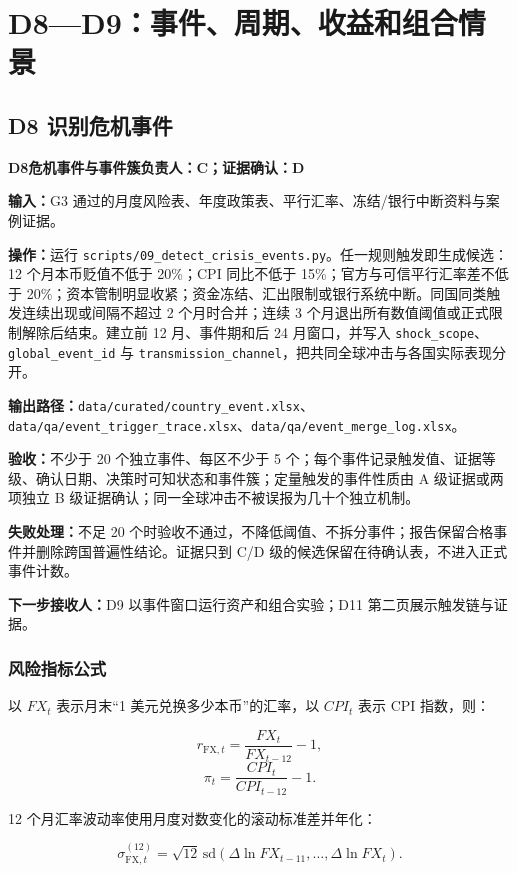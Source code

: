 \documentclass[UTF8,fontset=windows,12pt,openany]{ctexbook}
\newcommand{\Field}[1]{{\small\nolinkurl{#1}}}
\newcommand{\File}[1]{{\small\nolinkurl{#1}}}
\newcommand{\StepTitle}[3]{%
  \noindent\colorbox{DeepNavy}{\parbox{0.965\textwidth}{\color{white}\Large\bfseries #1\quad #2\hfill\normalsize #3}}\par\medskip
}
\newcommand{\CardRow}[2]{\noindent\textbf{#1：}#2\par}
\begin{document}
\chapter{D8—D9：事件、周期、收益和组合情景}

\section{D8 识别危机事件}
\StepTitle{D8}{危机事件与事件簇}{负责人：C；证据确认：D}
\CardRow{输入}{G3 通过的月度风险表、年度政策表、平行汇率、冻结/银行中断资料与案例证据。}
\CardRow{操作}{运行 \File{scripts/09_detect_crisis_events.py}。任一规则触发即生成候选：12 个月本币贬值不低于 20\%；CPI 同比不低于 15\%；官方与可信平行汇率差不低于 20\%；资本管制明显收紧；资金冻结、汇出限制或银行系统中断。同国同类触发连续出现或间隔不超过 2 个月时合并；连续 3 个月退出所有数值阈值或正式限制解除后结束。建立前 12 月、事件期和后 24 月窗口，并写入 \Field{shock_scope}、\Field{global_event_id} 与 \Field{transmission_channel}，把共同全球冲击与各国实际表现分开。}
\CardRow{输出路径}{\File{data/curated/country_event.xlsx}、\File{data/qa/event_trigger_trace.xlsx}、\File{data/qa/event_merge_log.xlsx}。}
\CardRow{验收}{不少于 20 个独立事件、每区不少于 5 个；每个事件记录触发值、证据等级、确认日期、决策时可知状态和事件簇；定量触发的事件性质由 A 级证据或两项独立 B 级证据确认；同一全球冲击不被误报为几十个独立机制。}
\CardRow{失败处理}{不足 20 个时验收不通过，不降低阈值、不拆分事件；报告保留合格事件并删除跨国普遍性结论。证据只到 C/D 级的候选保留在待确认表，不进入正式事件计数。}
\CardRow{下一步接收人}{D9 以事件窗口运行资产和组合实验；D11 第二页展示触发链与证据。}

\subsection{风险指标公式}

以 \(FX_t\) 表示月末“1 美元兑换多少本币”的汇率，以 \(CPI_t\) 表示 CPI 指数，则：

\begin{equation}
r_{\mathrm{FX},t}=\frac{FX_t}{FX_{t-12}}-1,
\end{equation}
\begin{equation}
\pi_t=\frac{CPI_t}{CPI_{t-12}}-1.
\end{equation}

12 个月汇率波动率使用月度对数变化的滚动标准差并年化：

\begin{equation}
\sigma_{\mathrm{FX},t}^{(12)}=\sqrt{12}\,\mathrm{sd}\!\left(\Delta\ln FX_{t-11},\ldots,\Delta\ln FX_t\right).
\end{equation}
\end{document}
